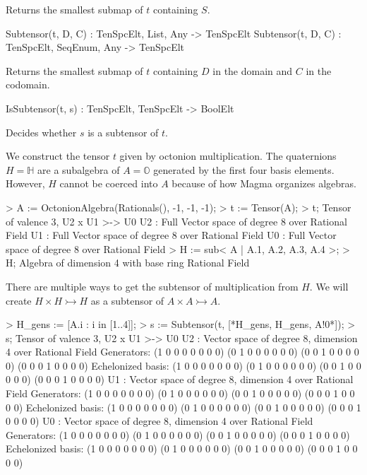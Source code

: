 Returns the smallest submap of $t$ containing $S$.

\begin{intrinsics}
Subtensor(t, D, C) : TenSpcElt, List, Any -> TenSpcElt
Subtensor(t, D, C) : TenSpcElt, SeqEnum, Any -> TenSpcElt
\end{intrinsics}

Returns the smallest submap of $t$ containing $D$ in the domain and $C$ in the 
codomain.

\begin{intrinsics}
IsSubtensor(t, s) : TenSpcElt, TenSpcElt -> BoolElt
\end{intrinsics}

Decides whether $s$ is a subtensor of $t$.

\begin{example}[Subtensors]

We construct the tensor $t$ given by octonion multiplication. The quaternions
$H=\mathbb{H}$ are a subalgebra of $A=\mathbb{O}$ generated by the first four
basis elements. However, $H$ cannot be coerced into $A$ because of how Magma
organizes algebras. 
\begin{code}
> A := OctonionAlgebra(Rationals(), -1, -1, -1);
> t := Tensor(A);
> t;
Tensor of valence 3, U2 x U1 >-> U0
U2 : Full Vector space of degree 8 over Rational Field
U1 : Full Vector space of degree 8 over Rational Field
U0 : Full Vector space of degree 8 over Rational Field
> H := sub< A | A.1, A.2, A.3, A.4 >;
> H;
Algebra of dimension 4 with base ring Rational Field
\end{code}

There are multiple ways to get the subtensor of multiplication from $H$. We will
create $H\times H\rightarrowtail H$ as a subtensor of $A\times A\rightarrowtail
A$. 
\begin{code}
> H_gens := [A.i : i in [1..4]];
> s := Subtensor(t, [*H_gens, H_gens, A!0*]);
> s;
Tensor of valence 3, U2 x U1 >-> U0
U2 : Vector space of degree 8, dimension 4 over Rational Field
Generators:
(1 0 0 0 0 0 0 0)
(0 1 0 0 0 0 0 0)
(0 0 1 0 0 0 0 0)
(0 0 0 1 0 0 0 0)
Echelonized basis:
(1 0 0 0 0 0 0 0)
(0 1 0 0 0 0 0 0)
(0 0 1 0 0 0 0 0)
(0 0 0 1 0 0 0 0)
U1 : Vector space of degree 8, dimension 4 over Rational Field
Generators:
(1 0 0 0 0 0 0 0)
(0 1 0 0 0 0 0 0)
(0 0 1 0 0 0 0 0)
(0 0 0 1 0 0 0 0)
Echelonized basis:
(1 0 0 0 0 0 0 0)
(0 1 0 0 0 0 0 0)
(0 0 1 0 0 0 0 0)
(0 0 0 1 0 0 0 0)
U0 : Vector space of degree 8, dimension 4 over Rational Field
Generators:
(1 0 0 0 0 0 0 0)
(0 1 0 0 0 0 0 0)
(0 0 1 0 0 0 0 0)
(0 0 0 1 0 0 0 0)
Echelonized basis:
(1 0 0 0 0 0 0 0)
(0 1 0 0 0 0 0 0)
(0 0 1 0 0 0 0 0)
(0 0 0 1 0 0 0 0)
\end{code}


\end{example}
